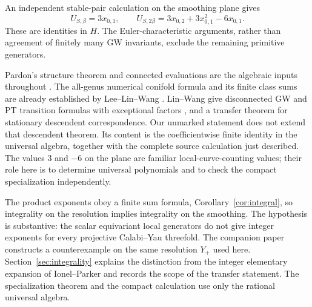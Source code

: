 An independent stable-pair calculation on the smoothing plane gives
\[
 U_{S,\beta}=3x_{0,1},\qquad
 U_{S,2\beta}=3x_{0,2}+3x_{0,1}^2-6x_{0,1}.
\]
These are identities in $H$. The Euler-characteristic arguments,
rather than agreement of finitely many GW invariants, exclude the
remaining primitive generators.

Pardon's structure theorem and connected evaluations are the algebraic
inputs throughout \cite{Pardon}. The all-genus numerical conifold
formula and its finite class sums are already established by
Lee--Lin--Wang \cite[Proposition 2.1]{LLW}. Lin--Wang give
disconnected GW and PT transition formulas with exceptional factors
\cite[Proposition 3.5]{LW}, and a transfer theorem for stationary
descendent correspondence. Our unmarked statement does not extend
that descendent theorem. Its content is the coefficientwise finite
identity in the universal algebra, together with the complete
source calculation just described. The values $3$ and $-6$ on the
plane are familiar local-curve-counting values; their role here is
to determine universal polynomials and to check the compact
specialization independently.

The product exponents obey a finite sum formula,
Corollary~\ref{cor:integral}, so integrality on the resolution implies
integrality on the smoothing. The hypothesis is substantive: the
scalar equivariant local generators do not give integer exponents
for every projective Calabi--Yau threefold. The companion paper
\cite{WuebbenIntegrality} constructs a counterexample on the same
resolution $Y_+$ used here. Section~\ref{sec:integrality} explains
the distinction from the integer elementary expansion of
Ionel--Parker and records the scope of the transfer statement.
The specialization theorem and the compact calculation use only
the rational universal algebra.
